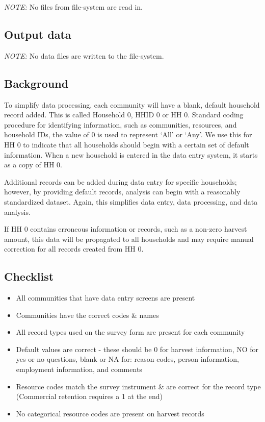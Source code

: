 \documentclass[
]{article}
\providecommand{\tightlist}{%
  \setlength{\itemsep}{0pt}\setlength{\parskip}{0pt}}
\begin{document}
\emph{NOTE:} No files from file-system are read in.

\subsection{Output data}\label{output-data}

\emph{NOTE:} No data files are written to the file-system.

\subsection{Background}\label{background}

To simplify data processing, each community will have a blank, default
household record added. This is called Household 0, HHID 0 or HH 0.
Standard coding procedure for identifying information, such as
communities, resources, and household IDs, the value of 0 is used to
represent `All' or `Any'. We use this for HH 0 to indicate that all
households should begin with a certain set of default information. When
a new household is entered in the data entry system, it starts as a copy
of HH 0.

Additional records can be added during data entry for specific
households; however, by providing default records, analysis can begin
with a reasonably standardized dataset. Again, this simplifies data
entry, data processing, and data analysis.

If HH 0 contains erroneous information or records, such as a non-zero
harvest amount, this data will be propagated to all households and may
require manual correction for all records created from HH 0.

\subsection{Checklist}\label{checklist}

\begin{itemize}
\tightlist
\item
  All communities that have data entry screens are present\\
\item
  Communities have the correct codes \& names\\
\item
  All record types used on the survey form are present for each
  community\\
\item
  Default values are correct - these should be 0 for harvest
  information, NO for yes or no questions, blank or NA for: reason
  codes, person information, employment information, and comments\\
\item
  Resource codes match the survey instrument \& are correct for the
  record type (Commercial retention requires a 1 at the end)
\item
  No categorical resource codes are present on harvest records
\end{itemize}
\end{document}
